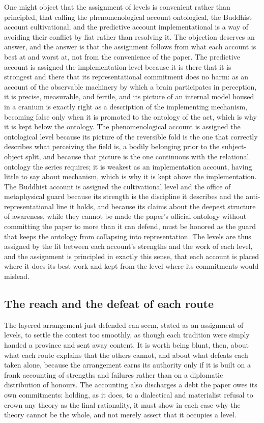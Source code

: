 One might object that the assignment of levels is convenient rather than principled, that calling the phenomenological account ontological, the Buddhist account cultivational, and the predictive account implementational is a way of avoiding their conflict by fiat rather than resolving it. The objection deserves an answer, and the answer is that the assignment follows from what each account is best at and worst at, not from the convenience of the paper. The predictive account is assigned the implementation level because it is there that it is strongest and there that its representational commitment does no harm: as an account of the observable machinery by which a brain participates in perception, it is precise, measurable, and fertile, and its picture of an internal model housed in a cranium is exactly right as a description of the implementing mechanism, becoming false only when it is promoted to the ontology of the act, which is why it is kept below the ontology. The phenomenological account is assigned the ontological level because its picture of the reversible fold is the one that correctly describes what perceiving the field is, a bodily belonging prior to the subject-object split, and because that picture is the one continuous with the relational ontology the series requires; it is weakest as an implementation account, having little to say about mechanism, which is why it is kept above the implementation. The Buddhist account is assigned the cultivational level and the office of metaphysical guard because its strength is the discipline it describes and the anti-representational line it holds, and because its claims about the deepest structure of awareness, while they cannot be made the paper's official ontology without committing the paper to more than it can defend, must be honored as the guard that keeps the ontology from collapsing into representation. The levels are thus assigned by the fit between each account's strengths and the work of each level, and the assignment is principled in exactly this sense, that each account is placed where it does its best work and kept from the level where its commitments would mislead.

\subsection{The reach and the defeat of each route}
\label{p22:sub:perception-ledger}

The layered arrangement just defended can seem, stated as an assignment of levels, to settle the contest too smoothly, as though each tradition were simply handed a province and sent away content. It is worth being blunt, then, about what each route explains that the others cannot, and about what defeats each taken alone, because the arrangement earns its authority only if it is built on a frank accounting of strengths and failures rather than on a diplomatic distribution of honours. The accounting also discharges a debt the paper owes its own commitments: holding, as it does, to a dialectical and materialist refusal to crown any theory as the final rationality, it must show in each case why the theory cannot be the whole, and not merely assert that it occupies a level.

